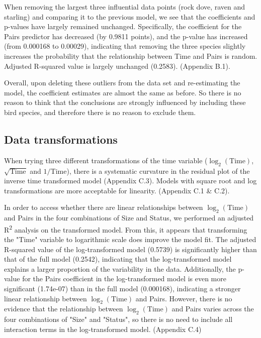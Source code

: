 \documentclass[a4paper, 12pt]{article}
\begin{document}
\begin{spacing}{1.5}
When removing the largest three influential data points (rock dove, raven and starling) and comparing it to the previous model, we see that the coefficients and p-values have largely remained unchanged. Specifically, the coefficient for the Pairs predictor has decreased (by 0.9811 points), and the p-value has increased (from 0.000168 to 0.00029), indicating that removing the three species slightly increases the probability that the relationship between Time and Pairs is random. Adjusted R-squared value is largely unchanged (0.2583). (Appendix B.1).

Overall, upon deleting these outliers from the data set and re-estimating the model, the coefficient estimates are almost the same as before. So there is no reason to think that the conclusions are strongly influenced by including these bird species, and therefore there is no reason to exclude them.

\subsection{Data transformations}
When trying three different transformations of the time variable ($\log_2(\text{Time})$, $\sqrt{\text{Time}}$ and $1/\text{Time}$), there is a systematic curvature in the residual plot of the inverse time transformed model (Appendix C.3). Models with square root and log transformations are more acceptable for linearity. (Appendix C.1 \& C.2).

In order to access whether there are linear relationships between $\log_2(\text{Time})$ and Pairs in the four combinations of Size and Status, we performed an adjusted R\textsuperscript{2} analysis on the transformed model. From this, it appears that transforming the "Time" variable to logarithmic scale does improve the model fit. The adjusted R-squared value of the log-transformed model (0.5739) is significantly higher than that of the full model (0.2542), indicating that the log-transformed model explains a larger proportion of the variability in the data. Additionally, the p-value for the Pairs coefficient in the log-transformed model is even more significant (1.74e-07) than in the full model (0.000168), indicating a stronger linear relationship between $\log_2(\text{Time})$ and Pairs. However, there is no evidence that the relationship between $\log_2(\text{Time})$ and Pairs varies across the four combinations of "Size" and "Status", so there is no need to include all interaction terms in the log-transformed model. (Appendix C.4)


\end{spacing}
\end{document}
